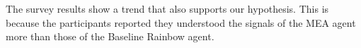 \documentclass[letterpaper]{article} %
\begin{document}
The  survey results show a trend  that also supports our hypothesis. This is because the participants reported they  understood the signals of the MEA agent more than those of the Baseline Rainbow agent. %










\end{document}
